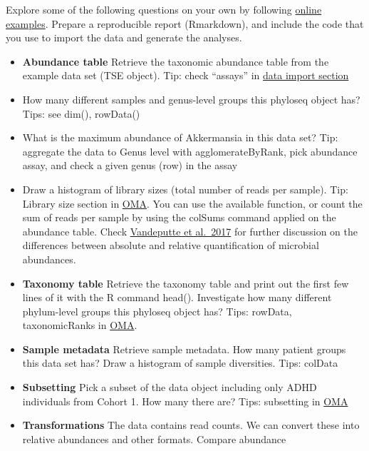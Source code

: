 \documentclass[
  oneside]{book}
\begin{document}
Explore some of the following questions on your own by following
\href{https://microbiome.github.io/OMA/}{online examples}. Prepare a
reproducible report (Rmarkdown), and include the code that you use to
import the data and generate the analyses.

\begin{itemize}
\item
  \textbf{Abundance table} Retrieve the taxonomic abundance table from the
  example data set (TSE object). Tip: check ``assays'' in \href{https://microbiome.github.io/OMA/data-introduction.html\#loading-experimental-microbiome-data}{data import
  section}
\item
  How many different samples and genus-level groups this phyloseq
  object has? Tips: see dim(), rowData()
\item
  What is the maximum abundance of Akkermansia in this data set? Tip:
  aggregate the data to Genus level with agglomerateByRank, pick
  abundance assay, and check a given genus (row) in the assay
\item
  Draw a histogram of library sizes (total number of reads per
  sample). Tip: Library size section in
  \href{https://microbiome.github.io/OMA/quality-control.html}{OMA}. You
  can use the available function, or count the sum of reads per
  sample by using the colSums command applied on the abundance
  table. Check \href{https://www.nature.com/articles/nature24460}{Vandeputte et
  al.~2017} for further
  discussion on the differences between absolute and relative
  quantification of microbial abundances.
\item
  \textbf{Taxonomy table} Retrieve the taxonomy table and print out the
  first few lines of it with the R command head(). Investigate how
  many different phylum-level groups this phyloseq object has? Tips:
  rowData, taxonomicRanks in
  \href{https://microbiome.github.io/OMA/taxonomic-information.html\#functions-to-access-taxonomic-information}{OMA}.
\item
  \textbf{Sample metadata} Retrieve sample metadata. How many patient
  groups this data set has? Draw a histogram of sample
  diversities. Tips: colData
\item
  \textbf{Subsetting} Pick a subset of the data object including only
  ADHD individuals from Cohort 1. How many there are? Tips: subsetting in \href{https://microbiome.github.io/OMA/datamanipulation.html\#subsetting}{OMA}
\item
  \textbf{Transformations} The data contains read counts. We can convert
  these into relative abundances and other formats. Compare abundance

\end{itemize}
\end{document}
